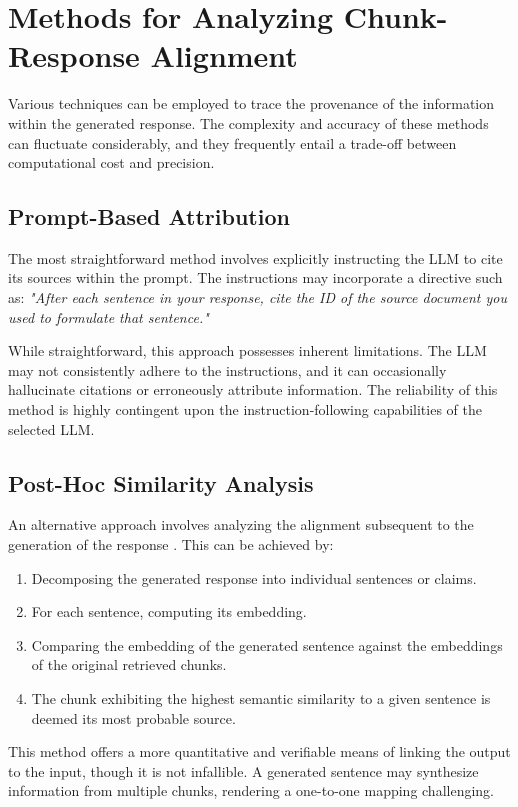 \section{Methods for Analyzing Chunk-Response Alignment}
Various techniques can be employed to trace the provenance of the information within the generated response. The complexity and accuracy of these methods can fluctuate considerably, and they frequently entail a trade-off between computational cost and precision.

\subsection{Prompt-Based Attribution}
The most straightforward method involves explicitly instructing the LLM to cite its sources within the prompt. The instructions may incorporate a directive such as: \textit{"After each sentence in your response, cite the ID of the source document you used to formulate that sentence."} \autocite{gao2024retrievalaugmentedgenerationlargelanguage}

While straightforward, this approach possesses inherent limitations. The LLM may not consistently adhere to the instructions, and it can occasionally hallucinate citations or erroneously attribute information. The reliability of this method is highly contingent upon the instruction-following capabilities of the selected LLM.

\subsection{Post-Hoc Similarity Analysis}
An alternative approach involves analyzing the alignment subsequent to the generation of the response \autocite{gao2024retrievalaugmentedgenerationlargelanguage}. This can be achieved by:
\begin{enumerate}
    \item Decomposing the generated response into individual sentences or claims.
    \item For each sentence, computing its embedding.
    \item Comparing the embedding of the generated sentence against the embeddings of the original retrieved chunks.
    \item The chunk exhibiting the highest semantic similarity to a given sentence is deemed its most probable source.
\end{enumerate}
This method offers a more quantitative and verifiable means of linking the output to the input, though it is not infallible. A generated sentence may synthesize information from multiple chunks, rendering a one-to-one mapping challenging.


